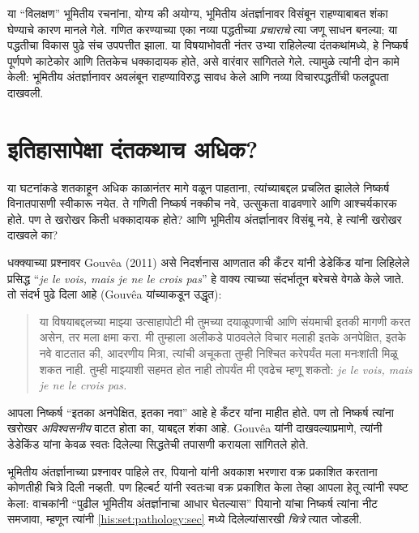 या “विलक्षण” भूमितीय रचनांना, योग्य की अयोग्य, भूमितीय अंतर्ज्ञानावर विसंबून राहण्याबाबत शंका घेण्याचे कारण मानले गेले. गणित करण्याच्या एका नव्या पद्धतीच्या \emph{प्रचाराचे} त्या जणू साधन बनल्या; या पद्धतीचा विकास पुढे संच उपपत्तीत झाला. या विषयाभोवती नंतर उभ्या राहिलेल्या दंतकथांमध्ये, हे निष्कर्ष पूर्णपणे काटेकोर आणि तितकेच धक्कादायक होते, असे वारंवार सांगितले गेले. त्यामुळे त्यांनी दोन कामे केली: भूमितीय अंतर्ज्ञानावर अवलंबून राहण्याविरुद्ध सावध केले आणि नव्या विचारपद्धतींची फलद्रूपता दाखवली.








\section{इतिहासापेक्षा दंतकथाच अधिक?}\label{his:set:mythology:sec}

या घटनांकडे शतकाहून अधिक काळानंतर मागे वळून पाहताना, त्यांच्याबद्दल प्रचलित झालेले निष्कर्ष विनातपासणी स्वीकारू नयेत. ते गणिती निष्कर्ष नक्कीच नवे, उत्सुकता वाढवणारे आणि आश्चर्यकारक होते. पण ते खरोखर किती धक्कादायक होते? आणि भूमितीय अंतर्ज्ञानावर विसंबू नये, हे त्यांनी खरोखर दाखवले का?

धक्क्याच्या प्रश्नावर Gouv\^{e}a (2011) असे निदर्शनास आणतात की कँटर यांनी डेडेकिंड यांना लिहिलेले प्रसिद्ध “\emph{je le vois, mais je ne le crois
pas}” हे वाक्य त्याच्या संदर्भातून बरेचसे वेगळे केले जाते. तो संदर्भ पुढे दिला आहे (Gouv\^{e}a यांच्याकडून उद्धृत):
\begin{quote}
या विषयाबद्दलच्या माझ्या उत्साहापोटी मी तुमच्या दयाळूपणाची आणि संयमाची इतकी मागणी करत असेन, तर मला क्षमा करा. मी तुम्हाला अलीकडे पाठवलेले विचार मलाही इतके अनपेक्षित, इतके नवे वाटतात की, आदरणीय मित्रा, त्यांची अचूकता तुम्ही निश्चित करेपर्यंत मला मनःशांती मिळू शकत नाही. तुम्ही माझ्याशी सहमत होत नाही तोपर्यंत मी एवढेच म्हणू शकतो:
\emph{je le vois, mais je ne le crois pas.}
\end{quote}
आपला निष्कर्ष “इतका अनपेक्षित, इतका नवा” आहे हे कँटर यांना माहीत होते. पण तो निष्कर्ष त्यांना खरोखर \emph{अविश्वसनीय} वाटत होता का, याबद्दल शंका आहे. Gouv\^{e}a यांनी दाखवल्याप्रमाणे, त्यांनी डेडेकिंड यांना केवळ स्वतः दिलेल्या सिद्धतेची तपासणी करायला सांगितले होते.

भूमितीय अंतर्ज्ञानाच्या प्रश्नावर पाहिले तर, पियानो यांनी अवकाश भरणारा वक्र प्रकाशित करताना कोणतीही चित्रे दिली नव्हती. पण हिल्बर्ट यांनी स्वतःचा वक्र प्रकाशित केला तेव्हा आपला हेतू त्यांनी स्पष्ट केला: वाचकांनी “पुढील भूमितीय अंतर्ज्ञानाचा आधार घेतल्यास” पियानो यांचा निष्कर्ष त्यांना नीट समजावा, म्हणून त्यांनी \ref{his:set:pathology:sec} मध्ये दिलेल्यांसारखी \emph{चित्रे} त्यात जोडली.

